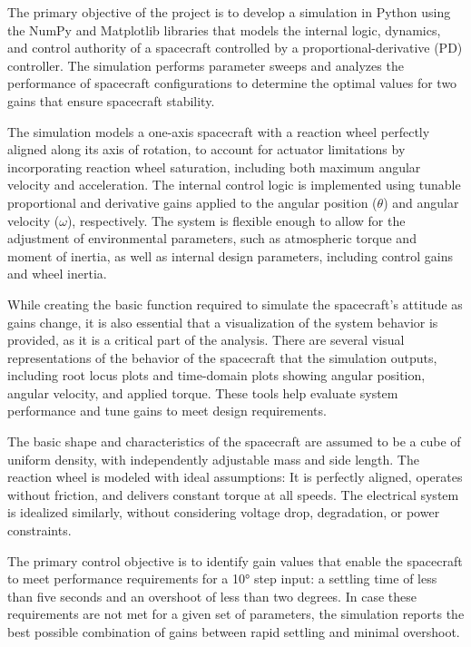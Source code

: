 \documentclass{ifacconf}
\begin{document}
The primary objective of the project is to develop a simulation in Python using the NumPy and Matplotlib libraries that models the internal logic, dynamics, and control authority of a spacecraft controlled by a proportional-derivative (PD) controller. The simulation performs parameter sweeps and analyzes the performance of spacecraft configurations to determine the optimal values for two gains that ensure spacecraft stability.

The simulation models a one-axis spacecraft with a reaction wheel perfectly aligned along its axis of rotation, to account for actuator limitations by incorporating reaction wheel saturation, including both maximum angular velocity and acceleration. The internal control logic is implemented using tunable proportional and derivative gains applied to the angular position ($\theta$) and angular velocity ($\omega$), respectively. The system is flexible enough to allow for the adjustment of environmental parameters, such as atmospheric torque and moment of inertia, as well as internal design parameters, including control gains and wheel inertia.

While creating the basic function required to simulate the spacecraft's attitude as gains change, it is also essential that a visualization of the system behavior is provided, as it is a critical part of the analysis. There are several visual representations of the behavior of the spacecraft that the simulation outputs, including root locus plots and time-domain plots showing angular position, angular velocity, and applied torque. These tools help evaluate system performance and tune gains to meet design requirements.

The basic shape and characteristics of the spacecraft are assumed to be a cube of uniform density, with independently adjustable mass and side length. The reaction wheel is modeled with ideal assumptions: It is perfectly aligned, operates without friction, and delivers constant torque at all speeds. The electrical system is idealized similarly, without considering voltage drop, degradation, or power constraints.

The primary control objective is to identify gain values that enable the spacecraft to meet performance requirements for a 10° step input: a settling time of less than five seconds and an overshoot of less than two degrees. In case these requirements are not met for a given set of parameters, the simulation reports the best possible combination of gains between rapid settling and minimal overshoot.
\end{document}

